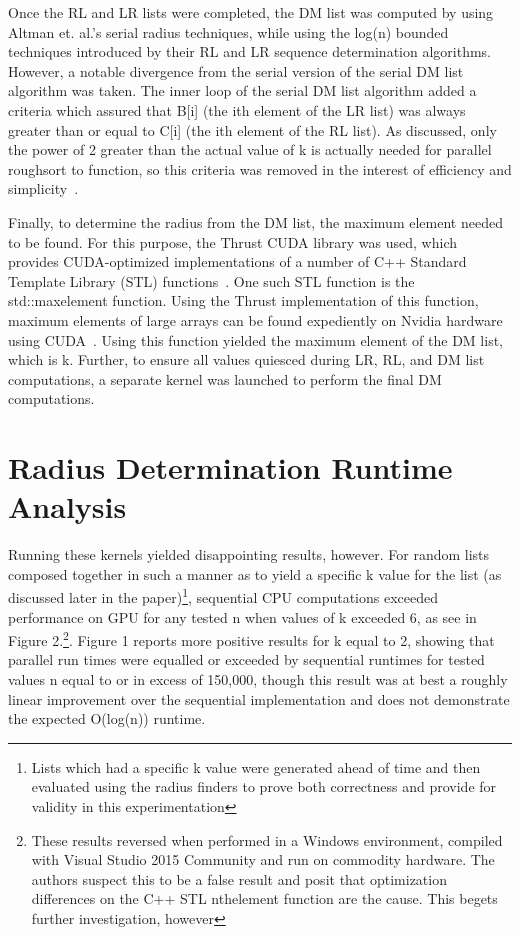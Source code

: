 \documentclass[letterpaper, 12pt]{article}
\let\supercite\cite
\renewcommand{\cite}[1]{\textnormal{~\supercite{#1}}}
\begin{document}
  Once the RL and LR lists were completed, the DM list was computed by using Altman et. al.\textquoteright s serial radius techniques, while using the log(n) bounded techniques introduced by their RL and LR sequence determination algorithms.  However, a notable divergence from the serial version of the serial DM list algorithm was taken.  The inner loop of the serial DM list algorithm added a criteria which assured that B[i] (the ith element of the LR list) was always greater than or equal to C[i] (the ith element of the RL list).  As discussed, only the power of 2 greater than the actual value of k is actually needed for parallel roughsort to function, so this criteria was removed in the interest of efficiency and simplicity\cite{altman89}.

  Finally, to determine the radius from the DM list, the maximum element needed to be found.  For this purpose, the Thrust CUDA library was used, which provides CUDA-optimized implementations of a number of C++ Standard Template Library (STL) functions\cite{thrust}.  One such STL function is the std::max\textunderscore element function.  Using the Thrust implementation of this function, maximum elements of large arrays can be found expediently on Nvidia hardware using CUDA\cite{extrema}.  Using this function yielded the maximum element of the DM list, which is k.  Further, to ensure all values quiesced during LR, RL, and DM list computations, a separate kernel was launched to perform the final DM computations.

\section{Radius Determination Runtime Analysis}
  Running these kernels yielded disappointing results, however.  For random lists composed together in such a manner as to yield a specific k value for the list (as discussed later in the paper)\footnote{Lists which had a specific k value were generated ahead of time and then evaluated using the radius finders to prove both correctness and provide for validity in this experimentation}, sequential CPU computations exceeded performance on GPU for any tested n when values of k exceeded 6, as see in Figure 2.\footnote{These results reversed when performed in a Windows environment, compiled with Visual Studio 2015 Community and run on commodity hardware.  The authors suspect this to be a false result and posit that optimization differences on the C++ STL nth\textunderscore element function are the cause.  This begets further investigation, however}.  Figure 1 reports more positive results for k equal to 2, showing that parallel run times were equalled or exceeded by sequential runtimes for tested values n equal to or in excess of 150,000, though this result was at best a roughly linear improvement over the sequential implementation and does not demonstrate the expected O(log(n)) runtime.
\end{document}
